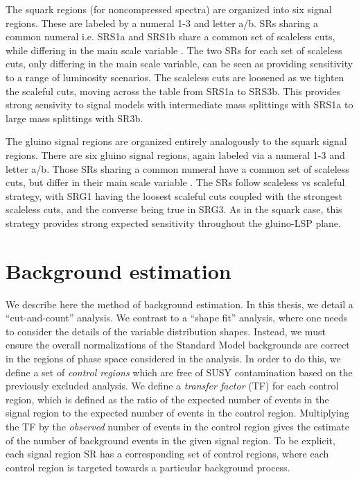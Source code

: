 The squark regions (for noncompressed spectra) are organized into six signal regions.
These are labeled by a numeral 1-3 and letter a/b.
SRs sharing a common numeral i.e. SRS1a and SRS1b share a common set of scaleless cuts, while differing in the main scale variable .
The two SRs for each set of scaleless cuts, only differing in the main scale variable, can be seen as providing sensitivity to a range of luminosity scenarios\footnotemark.
The scaleless cuts are loosened as we tighten the scaleful cuts, moving across the table from SRS1a to SRS3b.
This provides strong sensivity to signal models with intermediate mass splittings with SRS1a to large mass splittings with SR3b.

The gluino signal regions are organized entirely analogously to the squark signal regions.
There are six gluino signal regions, again labeled via a numeral 1-3 and letter a/b.
Those SRs sharing a common numeral have a common set of scaleless cuts, but differ in their main scale variable .
The SRs follow scaleless vs scaleful strategy, with SRG1 having the loosest scaleful cuts coupled with the strongest scaleless cuts, and the converse being true in SRG3.
As in the squark case, this strategy provides strong expected sensitivity throughout the gluino-LSP plane.



\section{Background estimation}

We describe here the method of background estimation.
In this thesis, we detail a ``cut-and-count'' analysis.
We contrast to a ``shape fit'' analysis, where one needs to consider the details of the variable distribution shapes.
Instead, we must ensure the overall normalizations of the Standard Model backgrounds are correct in the regions of phase space considered in the analysis.
In order to do this, we define a set of \textit{control regions} which are free of SUSY contamination based on the previously excluded analysis.
We define a \textit{transfer factor} (TF) for each control region, which is defined as the ratio of the expected number of events in the signal region to the expected number of events in the control region.
Multiplying the TF by the \textit{observed} number of events in the control region gives the estimate of the number of background events in the given signal region.
To be explicit, each signal region SR has a corresponding set of control regions, where each control region is targeted towards a particular background process.

